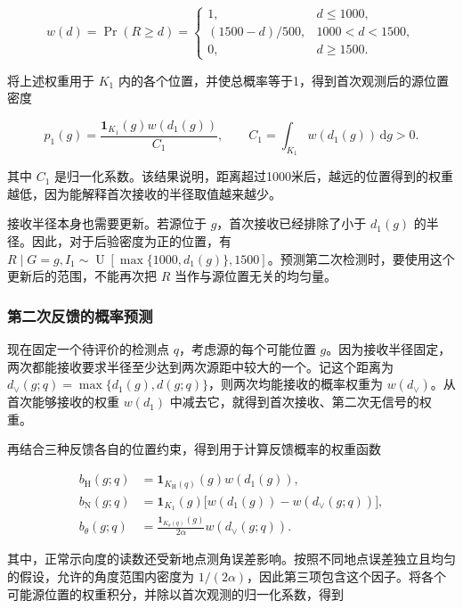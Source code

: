 \begin{equation}
 w(d)=\Pr(R\ge d)=
 \begin{cases}
 1,&d\le1000,\\
 (1500-d)/500,&1000<d<1500,\\
 0,&d\ge1500.
 \end{cases}
\label{eq:q2-pair-weight}
\end{equation}

将上述权重用于 \(K_1\) 内的各个位置，并使总概率等于1，得到首次观测后的源位置密度

\begin{equation}
 p_1(g)=\frac{\mathbf1_{K_1}(g)w(d_1(g))}{C_1},
 \qquad C_1=\int_{K_1}w(d_1(g))\,\mathrm dg>0.
\label{eq:q2-pair-posterior}
\end{equation}

其中 \(C_1\) 是归一化系数。该结果说明，距离超过1000米后，越远的位置得到的权重越低，因为能解释首次接收的半径取值越来越少。

接收半径本身也需要更新。若源位于 \(g\)，首次接收已经排除了小于 \(d_1(g)\) 的半径。因此，对于后验密度为正的位置，有 \(R\mid G=g,I_1\sim\operatorname{U}[\max\{1000,d_1(g)\},1500]\)。预测第二次检测时，要使用这个更新后的范围，不能再次把 \(R\) 当作与源位置无关的均匀量。

\subsubsection{第二次反馈的概率预测}

现在固定一个待评价的检测点 \(q\)，考虑源的每个可能位置 \(g\)。因为接收半径固定，两次都能接收要求半径至少达到两次源距中较大的一个。记这个距离为 \(d_\vee(g;q)=\max\{d_1(g),d(g;q)\}\)，则两次均能接收的概率权重为 \(w(d_\vee)\)。从首次能够接收的权重 \(w(d_1)\) 中减去它，就得到首次接收、第二次无信号的权重。

再结合三种反馈各自的位置约束，得到用于计算反馈概率的权重函数

\begin{equation}
\begin{aligned}
 b_{\mathrm H}(g;q)&=\mathbf1_{K_{\mathrm H}(q)}(g)w(d_1(g)),\\
 b_{\mathrm N}(g;q)&=\mathbf1_{K_1}(g)\bigl[w(d_1(g))-w(d_\vee(g;q))\bigr],\\
 b_\theta(g;q)&=\frac{\mathbf1_{K_\theta(q)}(g)}{2\alpha}w(d_\vee(g;q)).
\end{aligned}
\label{eq:q2-pair-feedback-weights}
\end{equation}

其中，正常示向度的读数还受新地点测角误差影响。按照不同地点误差独立且均匀的假设，允许的角度范围内密度为 \(1/(2\alpha)\)，因此第三项包含这个因子。将各个可能源位置的权重积分，并除以首次观测的归一化系数，得到

